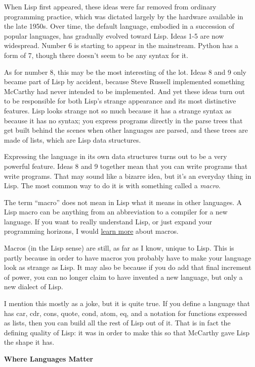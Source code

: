 \documentclass[12pt]{book}
\begin{document}
When Lisp first appeared, these ideas were far removed from ordinary
programming practice, which was dictated largely by the hardware
available in the late 1950s. Over time, the default language, embodied
in a succession of popular languages, has gradually evolved toward Lisp.
Ideas 1-5 are now widespread. Number 6 is starting to appear in the
mainstream. Python has a form of 7, though there doesn't seem to be any
syntax for it.

As for number 8, this may be the most interesting of the lot. Ideas 8
and 9 only became part of Lisp by accident, because Steve Russell
implemented something McCarthy had never intended to be implemented. And
yet these ideas turn out to be responsible for both Lisp's strange
appearance and its most distinctive features. Lisp looks strange not so
much because it has a strange syntax as because it has no syntax; you
express programs directly in the parse trees that get built behind the
scenes when other languages are parsed, and these trees are made of
lists, which are Lisp data structures.

Expressing the language in its own data structures turns out to be a
very powerful feature. Ideas 8 and 9 together mean that you can write
programs that write programs. That may sound like a bizarre idea, but
it's an everyday thing in Lisp. The most common way to do it is with
something called a \emph{macro.}

The term ``macro'' does not mean in Lisp what it means in other
languages. A Lisp macro can be anything from an abbreviation to a
compiler for a new language. If you want to really understand Lisp, or
just expand your programming horizons, I would \href{onlisp.html}{learn
more} about macros.

Macros (in the Lisp sense) are still, as far as I know, unique to Lisp.
This is partly because in order to have macros you probably have to make
your language look as strange as Lisp. It may also be because if you do
add that final increment of power, you can no longer claim to have
invented a new language, but only a new dialect of Lisp.

I mention this mostly as a joke, but it is quite true. If you define a
language that has car, cdr, cons, quote, cond, atom, eq, and a notation
for functions expressed as lists, then you can build all the rest of
Lisp out of it. That is in fact the defining quality of Lisp: it was in
order to make this so that McCarthy gave Lisp the shape it has.

\textbf{Where Languages Matter}
\end{document}
